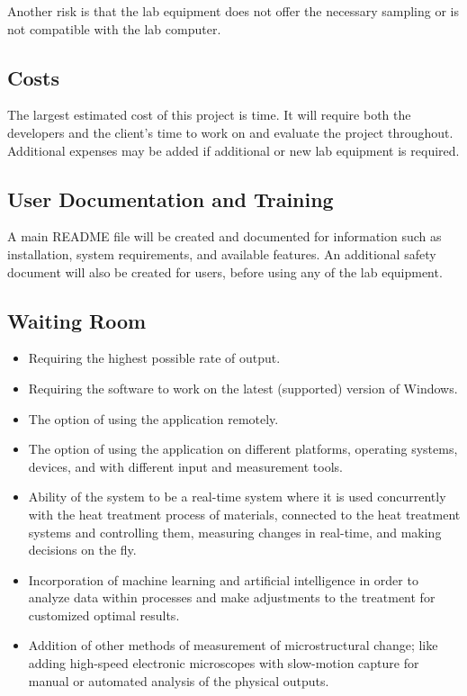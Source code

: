 \documentclass[12pt, titlepage]{article}
\begin{document}
\noindent Another risk is that the lab equipment does not offer the necessary sampling or is not compatible with the lab computer. 

\subsection{Costs}
The largest estimated cost of this project is time. It will require both the developers and the client's time to work on and evaluate the project throughout.
Additional expenses may be added if additional or new lab equipment is required. 

\subsection{User Documentation and Training}
A main README file will be created and documented for information such as installation, system requirements, and available features. 
An additional safety document will also be created for users, before using any of the lab equipment. 

\subsection{Waiting Room}
\begin{itemize}
    \item Requiring the highest possible rate of output.
    \item Requiring the software to work on the latest (supported) version of Windows.
    \item The option of using the application remotely.
    \item The option of using the application on different platforms, operating systems, devices, and with different input and measurement tools.
    \item Ability of the system to be a real-time system where it is used concurrently with the heat treatment process of materials, connected to the heat treatment systems and controlling them, measuring changes in real-time, and making decisions on the fly.
    \item Incorporation of machine learning and artificial intelligence in order to analyze data within processes and make adjustments to the treatment for customized optimal results.
    \item Addition of other methods of measurement of microstructural change; like adding high-speed electronic microscopes with slow-motion capture for manual or automated analysis of the physical outputs.
\end{itemize}
\end{document}
